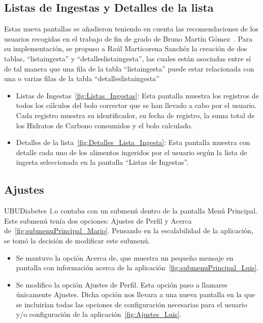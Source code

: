 \subsection{Listas de Ingestas y Detalles de la lista}
Estas nueva pantallas se añadieron teniendo en cuenta las recomendaciones de los usuarios recogidas en el trabajo de fin de grado de Bruno Martín Gómez~\cite{bruno2017}.
Para su implementación, se propuso a Raúl Marticorena Sanchéz la creación de dos tablas, ``listaingesta'' y ``detalleslistaingesta'', las cuales están asociadas entre sí de tal manera que una fila de la tabla “listaingesta” puede estar relacionada con una o varias filas  de la tabla ``detalleslistaingesta''
\begin{itemize}
	\item Listas de Ingestas~\ref{fig:Listas_Ingestas}: Esta pantalla muestra los registros de todos los cálculos del bolo corrector que se han llevado a cabo por el usuario. Cada registro muestra su identificador, su fecha de registro, la suma total de los Hidratos de Carbono consumidos y el bolo calculado.
	\item Detalles de la lista~\ref{fig:Detalles_Lista_Ingesta}: Esta pantalla muestra con detalle cada uno de los alimentos ingeridos por el usuario según la lista de ingesta seleccionada en la pantalla ``Listas de Ingestas''.
\end{itemize}
\subsection{Ajustes}
UBUDiabetes 1.o contaba con un submenú dentro de la pantalla Menú Principal. Este submenú tenía dos opciones: Ajustes de Perfil y Acerca de~\ref{fig:submenuPrincipal_Mario}.
Pensando en la escalabilidad de la aplicación, se tomó la decisión de modificar este submenú.
\begin{itemize}
	\item Se mantuvo la opción Acerca de, que muestra un pequeño mensaje en pantalla con información acerca de la aplicación~\ref{fig:submenuPrincipal_Luis}.
	\item Se modifico la opción Ajustes de Perfil. Esta opción paso a llamarse únicamente Ajustes. Dicha opción nos llevara a una nueva pantalla en la que se incluirían todas las opciones de configuración necesarias para el usuario y/o configuración de la aplicación~\ref{fig:Ajustes_Luis}.
\end{itemize}  
